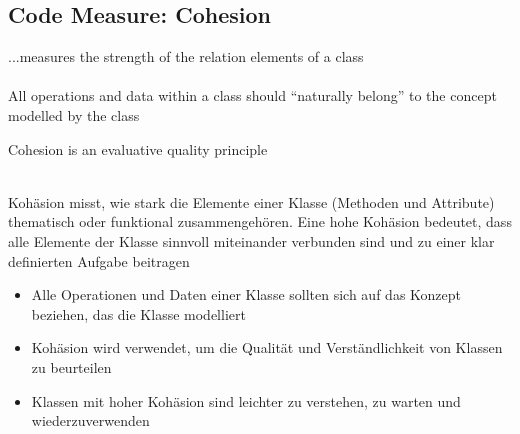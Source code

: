 \subsection{Code Measure: Cohesion}
\begin{defBox}[title=Coheseion ...]
    ...measures the strength of the relation  elements of a class\\
    \\
    All operations and data within a class should \enquote{naturally belong} to the concept modelled by the class
\end{defBox}
\begin{defBox}
    Cohesion is an evaluative quality principle
\end{defBox}
\begin{infoBox}[title=Code Measure: Kohäsion (Cohesion)]
    \\
    Kohäsion misst, wie stark die Elemente einer Klasse (Methoden und Attribute) thematisch oder funktional zusammengehören. Eine hohe Kohäsion bedeutet, dass alle Elemente der Klasse sinnvoll miteinander verbunden sind und zu einer klar definierten Aufgabe beitragen
\end{infoBox}
\begin{infoBox}[title=Motivation für Kohäsion]
    \begin{itemize}
        \item {} Alle Operationen und Daten einer Klasse sollten sich auf das Konzept beziehen, das die Klasse modelliert
        \item {} Kohäsion wird verwendet, um die Qualität und Verständlichkeit von Klassen zu beurteilen
        \item {} Klassen mit hoher Kohäsion sind leichter zu verstehen, zu warten und wiederzuverwenden
    \end{itemize}
\end{infoBox}
